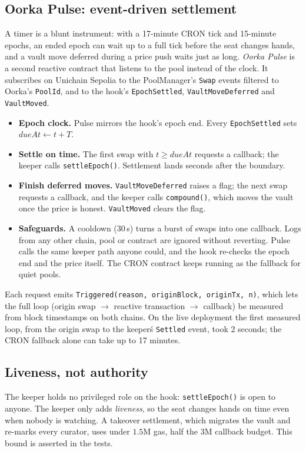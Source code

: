 \documentclass[11pt,a4paper]{article}
\newcommand{\code}[1]{\texttt{\small #1}}
\begin{document}
\subsection{Oorka Pulse: event-driven settlement}
A timer is a blunt instrument: with a 17-minute CRON tick and 15-minute epochs, an ended epoch can wait up to a full tick before the seat changes hands, and a vault move deferred during a price push waits just as long. \emph{Oorka Pulse} is a second reactive contract that listens to the pool instead of the clock. It subscribes on Unichain Sepolia to the PoolManager's \code{Swap} events filtered to Oorka's \code{PoolId}, and to the hook's \code{EpochSettled}, \code{VaultMoveDeferred} and \code{VaultMoved}.

\begin{itemize}
  \item \textbf{Epoch clock.} Pulse mirrors the hook's epoch end. Every \code{EpochSettled} sets $\textit{dueAt} \leftarrow t + T$.
  \item \textbf{Settle on time.} The first swap with $t \ge \textit{dueAt}$ requests a callback; the keeper calls \code{settleEpoch()}. Settlement lands seconds after the boundary.
  \item \textbf{Finish deferred moves.} \code{VaultMoveDeferred} raises a flag; the next swap requests a callback, and the keeper calls \code{compound()}, which moves the vault once the price is honest. \code{VaultMoved} clears the flag.
  \item \textbf{Safeguards.} A cooldown (30\,s) turns a burst of swaps into one callback. Logs from any other chain, pool or contract are ignored without reverting. Pulse calls the same keeper path anyone could, and the hook re-checks the epoch end and the price itself. The CRON contract keeps running as the fallback for quiet pools.
\end{itemize}

Each request emits \code{Triggered(reason, originBlock, originTx, n)}, which lets the full loop (origin swap $\rightarrow$ reactive transaction $\rightarrow$ callback) be measured from block timestamps on both chains. On the live deployment the first measured loop, from the origin swap to the keeper\'s \code{Settled} event, took 2 seconds; the CRON fallback alone can take up to 17 minutes.

\subsection{Liveness, not authority}
The keeper holds no privileged role on the hook: \code{settleEpoch()} is open to anyone. The keeper only adds \emph{liveness}, so the seat changes hands on time even when nobody is watching. A takeover settlement, which migrates the vault and re-marks every curator, uses under $1.5$M gas, half the $3$M callback budget. This bound is asserted in the tests.
\end{document}
